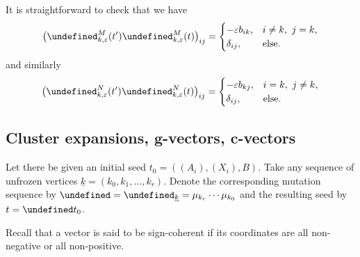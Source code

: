 \documentclass[10pt,a4paper]{amsart}
\newcommand{\opname}[1]{\operatorname{\mathsf{#1}}}
\newcommand{\uk}{{\underline{k}}}
\let\seq\undefined
\let\trans\undefined
\newcommand{\seq}{\boldsymbol{\mu}}%
\newcommand{\trans}{\opname{P}}
\numberwithin{equation}{section}
\begin{document}
\begin{Remark}\label{rem:signed_mutation_non_identity}
 It is straightforward to check that we have
 \[\bigl(\trans^M_{k,\varepsilon}(t')\trans^M_{k,\varepsilon}(t)\bigr)_{ij}=\begin{cases}
 -\varepsilon b_{ik}, & i\neq k,\ j=k,\\
 \delta_{ij}, & \mathrm{else}.
 \end{cases}\]
 and similarly
 \[
 \bigl(\trans^N_{k,\varepsilon}(t')\trans^N_{k,\varepsilon}(t)\bigr)_{ij} = \begin{cases}
 -\varepsilon b_{kj}, & i=k,\ j\neq k,\\
 \delta_{ij}, & \mathrm{else}.
 \end{cases}
 \]
\end{Remark}

\subsection[Cluster expansions, g-vectors, c-vectors]{Cluster expansions, $\boldsymbol{g}$-vectors, $\boldsymbol{c}$-vectors}

Let there be given an initial seed $t_{0}=((A_{i}),(X_{i}),B)$. Take
any sequence of unfrozen vertices $\uk=(k_{0},k_{1},\ldots,k_{r})$.
Denote the corresponding mutation sequence by $\seq=\seq_{\uk}=\mu_{k_{r}}\cdots\mu_{k_{0}}$
and the resulting seed by $t=\seq t_{0}$.

Recall that a vector is said to be sign-coherent if its coordinates
are all non-negative or all non-positive.
\end{document}
